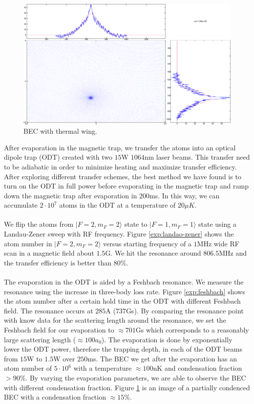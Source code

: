 \begin{figure}
  \begin{center}
    \includegraphics[width=12cm]{bec.png}
  \end{center}
  \caption{BEC with thermal wing.}
  \label{exp:bec-image}
\end{figure}
After evaporation in the magnetic trap, we transfer the atoms into an optical dipole trap (ODT) created with two $15$W $1064$nm laser beams. This transfer need to be adiabatic in order to minimize heating and maximize transfer efficiency. After exploring different transfer schemes, the best method we have found is to turn on the ODT in full power before evaporating in the magnetic trap and ramp down the magnetic trap after evaporation in $200$ms. In this way, we can accumulate $2\cdot10^7$ atoms in the ODT at a temperature of $20\mu K$.\\
\\
We flip the atoms from $|F=2, m_F=2\rangle$ state to $|F=1, m_F=1\rangle$ state using a Landau-Zener sweep with RF frequency. Figure \ref{exp:landao-zener} shows the atom number in $|F=2, m_F=2\rangle$ versus starting frequency of a $1$MHz wide RF scan in a magnetic field about $1.5$G. We hit the resonance around $806.5$MHz and the transfer efficiency is better than $80\%$.\\
\\
The evaporation in the ODT is aided by a Feshbach resonance. We measure the resonance using the increase in three-body loss rate. Figure \ref{exp:feshbach} shows the atom number after a certain hold time in the ODT with different Feshbach field. The resonance occurs at $285$A ($737$Gs). By comparing the resonance point with know data for the scattering length around the resonance, we set the Feshbach field for our evaporation to $\approx701$Gs which corresponds to a reasonably large scattering length ($\approx100a_0$). The evaporation is done by exponentially lower the ODT power, therefore the trapping depth, in each of the ODT beams from $15$W to $1.5$W over $250$ms. The BEC we get after the evaporation has an atom number of $5\cdot10^{6}$ with a temperature $\approx100$nK and condensation fraction $>90\%$. By varying the evaporation parameters, we are able to observe the BEC with different condensation fraction. Figure \ref{exp:bec-image} is an image of a partially condenced BEC with a condensation fraction $\approx15\%$.
